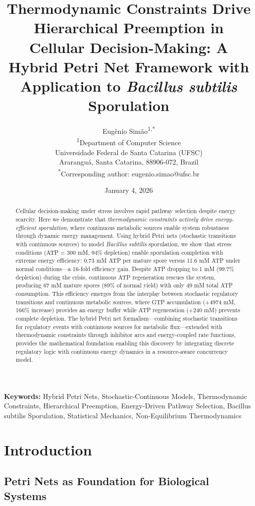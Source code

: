 \documentclass[twocolumn,11pt]{article}
\title{\textbf{Thermodynamic Constraints Drive Hierarchical Preemption in Cellular Decision-Making: A Hybrid Petri Net Framework with Application to \textit{Bacillus subtilis} Sporulation}}
\author{
Eugênio Simão\textsuperscript{1,*}\\
\textsuperscript{1}Department of Computer Science\\
Universidade Federal de Santa Catarina (UFSC)\\
Araranguá, Santa Catarina, 88906-072, Brazil\\
\textsuperscript{*}Corresponding author: eugenio.simao@ufsc.br
}
\date{January 4, 2026}
\begin{document}
\maketitle

\begin{abstract}
Cellular decision-making under stress involves rapid pathway selection despite energy scarcity. Here we demonstrate that \textit{thermodynamic constraints actively drive energy-efficient sporulation}, where continuous metabolic sources enable system robustness through dynamic energy management. Using hybrid Petri nets (stochastic transitions with continuous sources) to model \textit{Bacillus subtilis} sporulation, we show that stress conditions (ATP = 300 mM, 94\% depletion) enable sporulation completion with extreme energy efficiency: 0.73 mM ATP per mature spore versus 11.6 mM ATP under normal conditions—a 16-fold efficiency gain. Despite ATP dropping to 1 mM (99.7\% depletion) during the crisis, continuous ATP regeneration rescues the system, producing 67 mM mature spores (89\% of normal yield) with only 49 mM total ATP consumption. This efficiency emerges from the interplay between stochastic regulatory transitions and continuous metabolic sources, where GTP accumulation (+4974 mM, 166\% increase) provides an energy buffer while ATP regeneration (+240 mM) prevents complete depletion. The hybrid Petri net formalism—combining stochastic transitions for regulatory events with continuous sources for metabolic flux—extended with thermodynamic constraints through inhibitor arcs and energy-coupled rate functions, provides the mathematical foundation enabling this discovery by integrating discrete regulatory logic with continuous energy dynamics in a resource-aware concurrency model.
\end{abstract}

\textbf{Keywords:} Hybrid Petri Nets, Stochastic-Continuous Models, Thermodynamic Constraints, Hierarchical Preemption, Energy-Driven Pathway Selection, Bacillus subtilis Sporulation, Statistical Mechanics, Non-Equilibrium Thermodynamics

\section{Introduction}

\subsection{Petri Nets as Foundation for Biological Systems}
\end{document}
